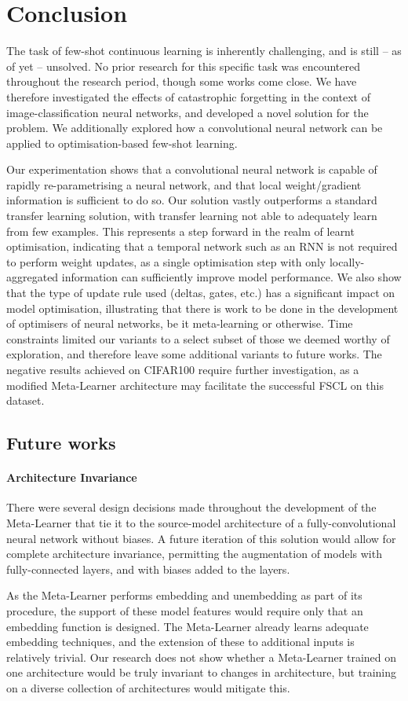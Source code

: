 \documentclass{report}
\begin{document}
\chapter{Conclusion} \label{conclusion}
The task of few-shot continuous learning is inherently challenging, and is still -- as of yet -- unsolved. No prior research for this specific task was encountered throughout the research period, though some works come close. We have therefore investigated the effects of catastrophic forgetting in the context of image-classification neural networks, and developed a novel solution for the problem. We additionally explored how a convolutional neural network can be applied to optimisation-based few-shot learning. \par
Our experimentation shows that a convolutional neural network is capable of rapidly re-parametrising a neural network, and that local weight/gradient information is sufficient to do so. Our solution vastly outperforms a standard transfer learning solution, with transfer learning not able to adequately learn from few examples. This represents a step forward in the realm of learnt optimisation, indicating that a temporal network such as an RNN is not required to perform weight updates, as a single optimisation step with only locally-aggregated information can sufficiently improve model performance. We also show that the type of update rule used (deltas, gates, etc.) has a significant impact on model optimisation, illustrating that there is work to be done in the development of optimisers of neural networks, be it meta-learning or otherwise. Time constraints limited our variants to a select subset of those we deemed worthy of exploration, and therefore leave some additional variants to future works. The negative results achieved on CIFAR100 require further investigation, as a modified Meta-Learner architecture may facilitate the successful FSCL on this dataset.

\section{Future works} \label{future-works}
\subsubsection{Architecture Invariance}
There were several design decisions made throughout the development of the Meta-Learner that tie it to the source-model architecture of a fully-convolutional neural network without biases. A future iteration of this solution would allow for complete architecture invariance, permitting the augmentation of models with fully-connected layers, and with biases added to the layers. \par
As the Meta-Learner performs embedding and unembedding as part of its procedure, the support of these model features would require only that an embedding function is designed. The Meta-Learner already learns adequate embedding techniques, and the extension of these to additional inputs is relatively trivial. Our research does not show whether a Meta-Learner trained on one architecture would be truly invariant to changes in architecture, but training on a diverse collection of architectures would mitigate this.
\end{document}
